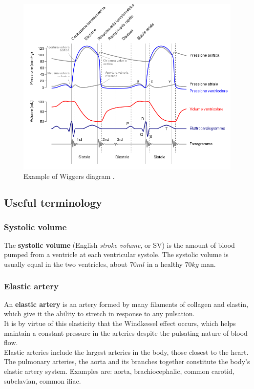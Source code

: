 \begin{figure}[h]
    \centering
    \includegraphics[width=1\textwidth]{images/Windkessel/Wiggers_Diagram_IT.svg.png}
    \caption{Example of Wiggers diagram \cite{wiki:DiagrammaWiggers}.}
    \label{WiggersDiagramma}
\end{figure}



\newpage

\subsection{Useful terminology}\label{terminologia}

\subsubsection{Systolic volume}
The \textbf{systolic volume} (English \textit{stroke volume}, or SV) is the amount of blood pumped from a ventricle at each ventricular systole. The systolic volume is usually equal in the two ventricles, about $70ml$ in a healthy $70kg$ man.


\subsubsection{Elastic artery}
An \textbf{elastic artery} is an artery formed by many filaments of collagen and elastin, which give it the ability to stretch in response to any pulsation. 
\\
It is by virtue of this elasticity that the Windkessel effect occurs, which helps maintain a constant pressure in the arteries despite the pulsating nature of blood flow. 
\\
Elastic arteries include the largest arteries in the body, those closest to the heart.
\\
The pulmonary arteries, the aorta and its branches together constitute the body's elastic artery system. Examples are: aorta, brachiocephalic, common carotid, subclavian, common iliac.


